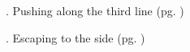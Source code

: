 \begin{minipage}[b][][b]{.5\textwidth}
\centering

\vspace{-0.6cm} . Pushing along the third line (pg. \pageref{5-4:3-3-invasion-3})
\end{minipage}%
\begin{minipage}[b][][b]{0.5\textwidth}
\centering
 
\vspace{-0.6cm} . Escaping to the side (pg. \pageref{5-4:3-3-invasion-4})
\end{minipage}